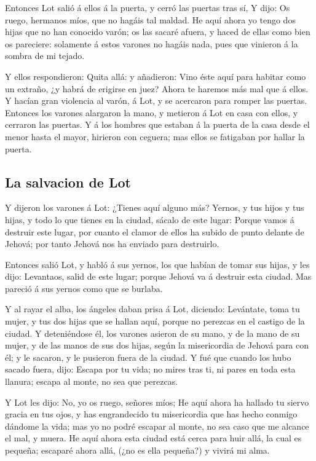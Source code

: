  Entonces Lot salió á ellos á la puerta, y cerró las
puertas tras sí,  Y dijo: Os ruego, hermanos míos, que no
hagáis tal maldad.  He aquí ahora yo tengo dos hijas que
no han conocido varón; os las sacaré afuera, y haced de ellas como bien
os pareciere: solamente á estos varones no hagáis nada, pues que
vinieron á la sombra de mi tejado.

 Y ellos respondieron: Quita allá: y añadieron: Vino éste
aquí para habitar como un extraño, ¿y habrá de erigirse en juez? Ahora
te haremos más mal que á ellos. Y hacían gran violencia al varón, á Lot,
y se acercaron para romper las puertas.  Entonces los
varones alargaron la mano, y metieron á Lot en casa con ellos, y
cerraron las puertas.  Y á los hombres que estaban á la
puerta de la casa desde el menor hasta el mayor, hirieron con ceguera;
mas ellos se fatigaban por hallar la puerta.

\hypertarget{la-salvacion-de-lot}{%
\subsection{La salvacion de Lot}\label{la-salvacion-de-lot}}

 Y dijeron los varones á Lot: ¿Tienes aquí alguno más?
Yernos, y tus hijos y tus hijas, y todo lo que tienes en la ciudad,
sácalo de este lugar:  Porque vamos á destruir este
lugar, por cuanto el clamor de ellos ha subido de punto delante de
Jehová; por tanto Jehová nos ha enviado para destruirlo.

 Entonces salió Lot, y habló á sus yernos, los que habían
de tomar sus hijas, y les dijo: Levantaos, salid de este lugar; porque
Jehová va á destruir esta ciudad. Mas pareció á sus yernos como que se
burlaba.

 Y al rayar el alba, los ángeles daban prisa á Lot,
diciendo: Levántate, toma tu mujer, y tus dos hijas que se hallan aquí,
porque no perezcas en el castigo de la ciudad.  Y
deteniéndose él, los varones asieron de su mano, y de la mano de su
mujer, y de las manos de sus dos hijas, según la misericordia de Jehová
para con él; y le sacaron, y le pusieron fuera de la ciudad.
 Y fué que cuando los hubo sacado fuera, dijo: Escapa por
tu vida; no mires tras ti, ni pares en toda esta llanura; escapa al
monte, no sea que perezcas.

 Y Lot les dijo: No, yo os ruego, señores míos;
 He aquí ahora ha hallado tu siervo gracia en tus ojos, y
has engrandecido tu misericordia que has hecho conmigo dándome la vida;
mas yo no podré escapar al monte, no sea caso que me alcance el mal, y
muera.  He aquí ahora esta ciudad está cerca para huir
allá, la cual es pequeña; escaparé ahora allá, (¿no es ella pequeña?) y
vivirá mi alma.

